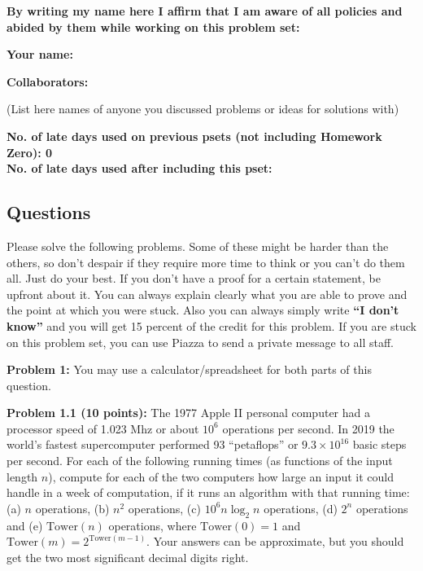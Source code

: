 \documentclass[11pt]{article}
\begin{document}
\textbf{By writing my name here I affirm that I am aware of all policies
and abided by them while working on this problem set:}

\textbf{Your name:} %

\textbf{Collaborators:} 

(List here names of anyone you discussed problems or ideas for solutions with)

\textbf{No. of late days used on previous psets (not including Homework Zero): 0
}\\
\textbf{No. of late days used after including this pset: %
}


\newpage



	\newpage


	\subsection*{Questions}\label{questions}

{	\color{red}
Please solve the following problems. Some of these might be harder than
the others, so don't despair if they require more time to think or you
can't do them all. Just do your best. If you don't have a proof
for a certain statement, be upfront about it. You can always explain
clearly what you are able to prove and the point at which you were
stuck. Also you can always simply write
\textbf{``I don't know''} and you will get 15 percent of the credit for
this problem. If you are stuck on this problem set, you can use Piazza to
send a private message to all staff.

}


\newcommand{\Tower}{\mathrm{Tower}}
\textbf{Problem 1:} You may use a calculator/spreadsheet for both parts of this question.

\textbf{Problem 1.1 (10 points):} The 1977 Apple II personal computer had a processor
speed of 1.023 Mhz or about $10^6$ operations per second. In 2019 the world’s fastest supercomputer performed 93
“petaflops”  or $9.3 \times 10^{16}$
basic steps per second. For each of the following running times
(as functions of the input length $n$), compute for each of the two computers how
large an input it could handle in a week of computation, if it runs
an algorithm with that running time: (a) $n$ operations, (b) $n^2$ operations, (c) $10^6 n \log_2 n$ operations, (d) $2^n$ operations and (e) $\Tower(n)$ operations, where $\Tower(0) = 1$ and $\Tower(m) = 2^{\Tower(m-1)}$. Your answers can be approximate, but you should get the two most significant decimal digits right.
\end{document}
